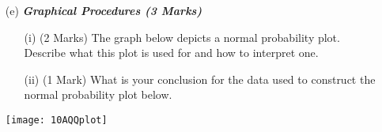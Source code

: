 \documentclass[]{article}
\begin{document}
\begin{itemize}
\item[(e)] \textbf{\textit{Graphical Procedures (3 Marks)}}
\begin{itemize}
\item[(i)] (2 Marks) The graph below depicts a normal probability plot. Describe what this plot is used for and how to interpret one.
\item[(ii)](1 Mark) What is your conclusion for the data used to construct the normal probability plot below.
\end{itemize}
\begin{center}
\texttt{[image: 10AQQplot]}
\end{center}
\end{itemize}
\end{document}
